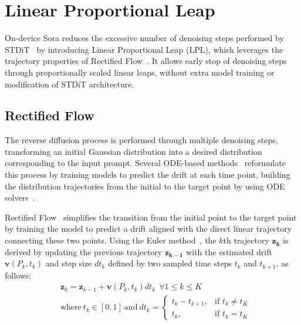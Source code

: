 
\section{Linear Proportional Leap}
\label{sec:ours1}

On-device Sora reduces the excessive number of denoising steps performed by STDiT~\cite{opensora} by introducing Linear Proportional Leap (LPL), which leverages the trajectory properties of Rectified Flow~\cite{liu2022flow}. It allows early stop of denoising steps through proportionally scaled linear leaps, without extra model training or modification of STDiT architecture.

\subsection{Rectified Flow}

The reverse diffusion process is performed through multiple denoising steps, transforming an initial Gaussian distribution into a desired distribution corresponding to the input prompt. Several ODE-based methods~\cite{zheng2023dpm, lu2022dpm} reformulate this process by training models to predict the drift at each time point, building the distribution trajectories from the initial to the target point by using ODE solvers~\cite{runge1895numerische, yang2023diffusion}.

Rectified Flow~\cite{liu2022flow} simplifies the transition from the initial point to the target point by training the model to predict a drift aligned with the direct linear trajectory connecting these two points. Using the Euler method~\cite{chen2018neural}, the $k$th trajectory $\boldsymbol{z_k}$ is derived by updating the previous trajectory $\boldsymbol{z_{k-1}}$ with the estimated drift $\boldsymbol{v}(P_k,t_k)$ and step size $dt_k$ defined by two sampled time steps $t_k$ and $t_{k+1}$, as follows:
\begin{equation}
\begin{split}
    &\boldsymbol{z}_k = \boldsymbol{z}_{k-1} + \boldsymbol{v}(P_k,t_k)dt_k ~~ \forall 1 \leq k \leq K
    \\
    & \text{where}~ t_{k} \in [0,1] ~\text{and}~ dt_k = 
\begin{cases} 
    t_k {-} t_{k+1}, & \text{if } t_k \neq t_K \\
t_k, & \text{if } t_k = t_K
\end{cases}
\end{split}
    \label{eq:rflow}
\end{equation}

